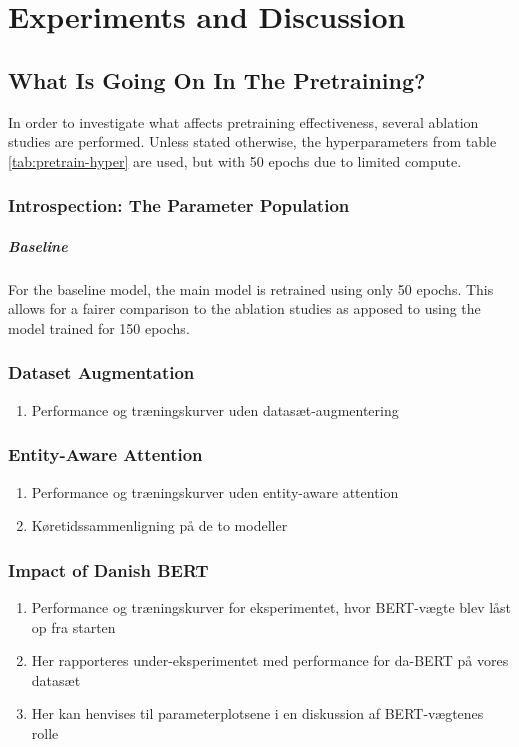 \documentclass[main.tex]{subfiles}
\begin{document}
\chapter{Experiments and Discussion}

\section{What Is Going On In The Pretraining?}
In order to investigate what affects pretraining effectiveness, several ablation studies are performed.
Unless stated otherwise, the hyperparameters from table \ref{tab:pretrain-hyper} are used, but with 50 epochs due to limited compute.

\subsection{Introspection: The Parameter Population}

\paragraph{Baseline}
For the baseline model, the main model is retrained using only 50 epochs.
This allows for a fairer comparison to the ablation studies as apposed to using the model trained for 150 epochs.

\subsection{Dataset Augmentation}
\begin{enumerate}
    \item Performance og træningskurver uden datasæt-augmentering
\end{enumerate}

\subsection{Entity-Aware Attention}
\begin{enumerate}
    \item Performance og træningskurver uden entity-aware attention
    \item Køretidssammenligning på de to modeller
\end{enumerate}

\subsection{Impact of Danish BERT}
\begin{enumerate}
    \item Performance og træningskurver for eksperimentet, hvor BERT-vægte blev låst op fra starten
    \item Her rapporteres under-eksperimentet med performance for da-BERT på vores datasæt
    \item Her kan henvises til parameterplotsene i en diskussion af BERT-vægtenes rolle
\end{enumerate}
\end{document}
